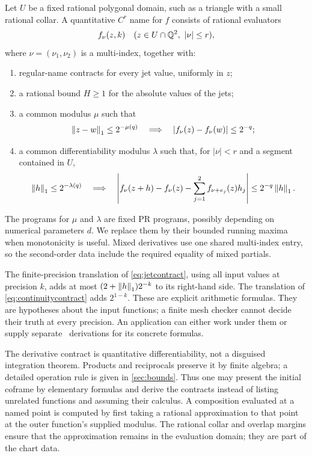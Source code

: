 Let $U$ be a fixed rational polygonal domain, such as a triangle with a small rational collar. A quantitative $C^r$ name for $f$ consists of rational evaluators
\[
f_\nu(z,k)\quad (z\in U\cap\mathbb Q^2,\ |\nu|\le r),
\]
where $\nu=(\nu_1,\nu_2)$ is a multi-index, together with:
\begin{enumerate}
\item regular-name contracts for every jet value, uniformly in $z$;
\item a rational bound $H\ge1$ for the absolute values of the jets;
\item a common modulus $\mu$ such that
\begin{equation}\label{eq:continuitycontract}
\left\|z-w\right\|_1\le2^{-\mu(q)}
\quad\Longrightarrow\quad
\left|f_\nu(z)-f_\nu(w)\right|\le2^{-q};
\end{equation}
\item a common differentiability modulus $\lambda$ such that, for $|\nu|<r$ and a segment contained in $U$,
\begin{equation}\label{eq:jetcontract}
\begin{split}
\left\|h\right\|_1\le2^{-\lambda(q)}\quad\Longrightarrow\quad
\left|f_\nu(z+h)-f_\nu(z)
-\sum_{j=1}^2f_{\nu+e_j}(z)h_j\right|
\le2^{-q}\left\|h\right\|_1.
\end{split}
\end{equation}
\end{enumerate}
The programs for $\mu$ and $\lambda$ are fixed PR programs, possibly depending on numerical parameters $d$. We replace them by their bounded running maxima when monotonicity is useful. Mixed derivatives use one shared multi-index entry, so the second-order data include the required equality of mixed partials.

The finite-precision translation of \eqref{eq:jetcontract}, using all input values at precision $k$, adds at most $(2+\left\|h\right\|_1)2^{-k}$ to its right-hand side. The translation of \eqref{eq:continuitycontract} adds $2^{1-k}$. These are explicit arithmetic formulas. They are hypotheses about the input functions; a finite mesh checker cannot decide their truth at every precision. An application can either work under them or supply separate \ipra\ derivations for its concrete formulas.

The derivative contract is quantitative differentiability, not a disguised integration theorem. Products and reciprocals preserve it by finite algebra; a detailed operation rule is given in \cref{sec:bounds}. Thus one may present the initial coframe by elementary formulas and derive the contracts instead of listing unrelated functions and assuming their calculus. A composition evaluated at a named point is computed by first taking a rational approximation to that point at the outer function's supplied modulus. The rational collar and overlap margins ensure that the approximation remains in the evaluation domain; they are part of the chart data.

